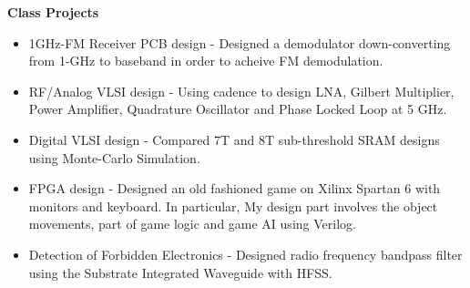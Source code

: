\documentclass[]{article}
\begin{document}
\noindent \textbf{Class Projects}
\begin{itemize}

\item 1GHz-FM Receiver PCB design -
Designed a demodulator down-converting from 1-GHz to baseband in order to
acheive FM demodulation.

\item RF/Analog VLSI design -
Using cadence to design LNA, Gilbert Multiplier, Power Amplifier, Quadrature
Oscillator and Phase Locked Loop at 5 GHz.

\item Digital VLSI design - 
Compared 7T and 8T sub-threshold SRAM designs using Monte-Carlo Simulation.

\item FPGA design - 
Designed an old fashioned game on Xilinx Spartan 6 with monitors and keyboard.
In particular, My design part involves the object movements, part of game logic
and game AI using Verilog.


\item Detection of Forbidden Electronics -
Designed radio frequency bandpass filter using the Substrate Integrated
Waveguide with HFSS.


\end{itemize}
\end{document}
